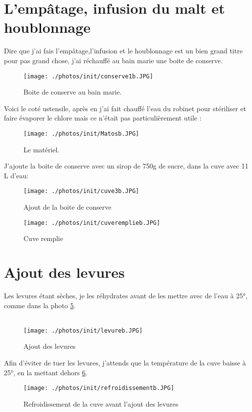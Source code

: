 \documentclass[twoside,twocolumn]{report}
\begin{document}
		\section{L'empâtage, infusion du malt et houblonnage} 
			Dire que j'ai fais l'empâtage,l'infusion et le houblonnage est un bien grand titre pour pas grand chose, j'ai réchauffé au bain marie une boite de conserve. \\
			 \begin{figure}[h!]
			 	\centering
			 	\texttt{[image: ./photos/init/conserve1b.JPG]}
			 	\caption{Boite de conserve au bain marie.}
			 	\label{boite}
			 \end{figure}
			Voici le coté ustensile, après en j'ai fait chauffé l'eau du robinet pour stériliser et faire évaporer le chlore mais ce n'était pas particulièrement utile :
			\begin{figure}[h!]
				\centering
				\texttt{[image: ./photos/init/Matosb.JPG]}
				\caption{Le matériel.}
				\label{matos}
			\end{figure}
			J'ajoute la boite de conserve avec un sirop de 750g de sucre, dans la cuve avec 11 L d'eau:
			\begin{figure}[h!]
				\centering
				\texttt{[image: ./photos/init/cuve3b.JPG]}
				\caption{Ajout de la boite de conserve}
				\label{cuve}
			\end{figure}
			\begin{figure}[h!]
			\centering
			\texttt{[image: ./photos/init/cuveremplieb.JPG]}
			\caption{Cuve remplie}
			\label{cuver}
			\end{figure}
			\section{Ajout des levures}
			Les levures étant sèches, je les réhydrates avant de les mettre avec de l'eau à 25°, comme dans la photo \ref{levure}.\\ \\
			\begin{figure}[h!]
				\centering
				\texttt{[image: ./photos/init/levureb.JPG]}
				\caption{Ajout des levures}
				\label{levure}
			\end{figure}
			Afin d'éviter de tuer les levures, j'attends que la température de la cuve baisse à 25°, en la mettant dehors \ref{refroid}.
			\begin{figure}[h!]
				\centering
				\texttt{[image: ./photos/init/refroidissementb.JPG]}
				\caption{Refroidissement de la cuve avant l'ajout des levures}
				\label{refroid}
			\end{figure}
		
\end{document}
